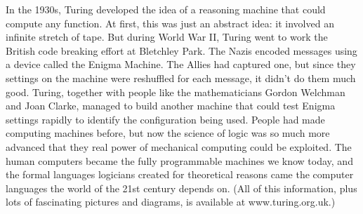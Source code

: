 In the 1930s, Turing developed the idea of a reasoning machine that could compute any function. At first, this was just an abstract idea: it involved an infinite stretch of tape. But during World War II, Turing went to work the British code breaking effort at Bletchley Park. The Nazis encoded messages using a device called the Enigma Machine. The Allies had captured one, but since they settings on the machine were reshuffled for each message, it didn't do them much good. Turing, together with people like the mathematicians Gordon Welchman and Joan Clarke, managed to build another machine that could test Enigma settings rapidly to identify the configuration being used. People had made computing machines before, but now the science of logic was so much more advanced that they real power of mechanical computing could be exploited. The human computers became the fully programmable machines we know today, and the formal languages logicians created for theoretical reasons came the computer languages the world of the 21st century depends on. (All of this information, plus lots of fascinating pictures and diagrams, is available at www.turing.org.uk.)



